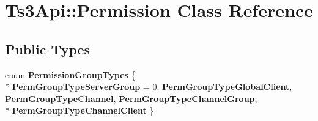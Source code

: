 \hypertarget{class_ts3_api_1_1_permission}{}\section{Ts3\+Api\+:\+:Permission Class Reference}
\label{class_ts3_api_1_1_permission}
\subsection*{Public Types}
\begin{DoxyCompactItemize}
\item 
enum {\bfseries Permission\+Group\+Types} \{ \\*
{\bfseries Perm\+Group\+Type\+Server\+Group} = 0, 
{\bfseries Perm\+Group\+Type\+Global\+Client}, 
{\bfseries Perm\+Group\+Type\+Channel}, 
{\bfseries Perm\+Group\+Type\+Channel\+Group}, 
\\*
{\bfseries Perm\+Group\+Type\+Channel\+Client}
 \}\hypertarget{class_ts3_api_1_1_permission_a9ce809facb0ce3404580d1bd485a0602}{}\label{class_ts3_api_1_1_permission_a9ce809facb0ce3404580d1bd485a0602}

\end{DoxyCompactItemize}
